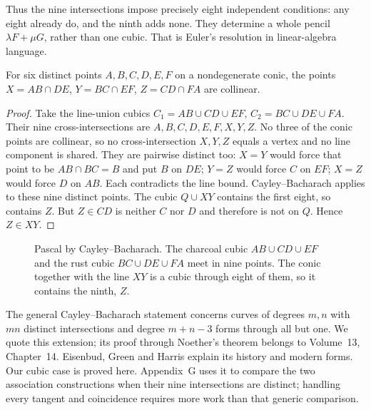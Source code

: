 Thus the nine intersections impose precisely eight independent conditions: any eight already do, and the ninth adds none. They determine a whole pencil $\lambda F+\mu G$, rather than one cubic. That is Euler's resolution in linear-algebra language.

\begin{corollary}\label{geometry:cor:pascalcb}
For six distinct points $A,B,C,D,E,F$ on a nondegenerate conic, the points $X=AB\cap DE$, $Y=BC\cap EF$, $Z=CD\cap FA$ are collinear.
\end{corollary}
\begin{proof}
Take the line-union cubics $C_1=AB\cup CD\cup EF$, $C_2=BC\cup DE\cup FA$. Their nine cross-intersections are $A,B,C,D,E,F,X,Y,Z$. No three of the conic points are collinear, so no cross-intersection $X,Y,Z$ equals a vertex and no line component is shared. They are pairwise distinct too: $X=Y$ would force that point to be $AB\cap BC=B$ and put $B$ on $DE$; $Y=Z$ would force $C$ on $EF$; $X=Z$ would force $D$ on $AB$. Each contradicts the line bound. Cayley--Bacharach applies to these nine distinct points. The cubic $Q\cup XY$ contains the first eight, so contains $Z$. But $Z\in CD$ is neither $C$ nor $D$ and therefore is not on $Q$. Hence $Z\in XY$.
\end{proof}

\begin{figure}[ht]
\centering
{}
\caption{Pascal by Cayley--Bacharach. The charcoal cubic $AB\cup CD\cup EF$ and the rust cubic $BC\cup DE\cup FA$ meet in nine points. The conic together with the
line $XY$ is a cubic through eight of them, so it contains the ninth, $Z$.}
\label{geometry:fig:pascalcb}
\end{figure}

\begin{remark}
The general Cayley--Bacharach statement concerns curves of degrees $m,n$ with $mn$ distinct intersections and degree $m+n-3$ forms through all but one. We quote this extension; its proof through Noether's theorem belongs to Volume~13, Chapter~14. Eisenbud, Green and Harris explain its history and modern forms. Our cubic case is proved here. Appendix~G uses it to compare the two association constructions when their nine intersections are distinct; handling every tangent and coincidence requires more work than that generic comparison.
\end{remark}

